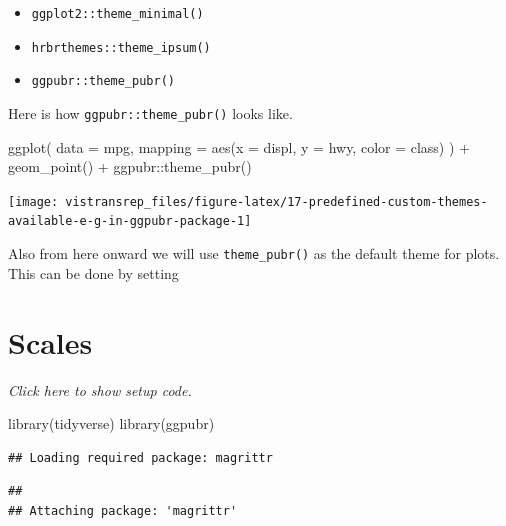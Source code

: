 \documentclass[]{book}
\newenvironment{Shaded}{}{}
\newcommand{\DataTypeTok}[1]{#1}
\newcommand{\KeywordTok}[1]{\textcolor[rgb]{0.00,0.00,1.00}{#1}}
\newcommand{\NormalTok}[1]{#1}
\newcommand{\OperatorTok}[1]{#1}
\newcommand{\StringTok}[1]{\textcolor[rgb]{0.00,0.50,0.50}{#1}}
\providecommand{\tightlist}{%
  \setlength{\itemsep}{0pt}\setlength{\parskip}{0pt}}
\begin{document}
\begin{itemize}
\tightlist
\item
  \texttt{ggplot2::theme\_minimal()}
\item
  \texttt{hrbrthemes::theme\_ipsum()}
\item
  \texttt{ggpubr::theme\_pubr()}
\end{itemize}

Here is how \texttt{ggpubr::theme\_pubr()} looks like.

\begin{Shaded}
\begin{Highlighting}[]
\KeywordTok{ggplot}\NormalTok{(}
  \DataTypeTok{data =}\NormalTok{ mpg,}
  \DataTypeTok{mapping =} \KeywordTok{aes}\NormalTok{(}\DataTypeTok{x =}\NormalTok{ displ, }\DataTypeTok{y =}\NormalTok{ hwy, }\DataTypeTok{color =}\NormalTok{ class)}
\NormalTok{) }\OperatorTok{+}
\StringTok{  }\KeywordTok{geom_point}\NormalTok{() }\OperatorTok{+}
\StringTok{  }\NormalTok{ggpubr}\OperatorTok{::}\KeywordTok{theme_pubr}\NormalTok{()}
\end{Highlighting}
\end{Shaded}

\begin{flushright}\texttt{[image: vistransrep\_files/figure-latex/17-predefined-custom-themes-available-e-g-in-ggpubr-package-1]} \end{flushright}

Also from here onward we will use \texttt{theme\_pubr()} as the default theme for plots.
This can be done by setting

\hypertarget{scales}{%
\section{Scales}\label{scales}}

\emph{Click here to show setup code.}

\begin{Shaded}
\begin{Highlighting}[]
\KeywordTok{library}\NormalTok{(tidyverse)}
\KeywordTok{library}\NormalTok{(ggpubr)}
\end{Highlighting}
\end{Shaded}

\begin{verbatim}
## Loading required package: magrittr
\end{verbatim}

\begin{verbatim}
## 
## Attaching package: 'magrittr'
\end{verbatim}
\end{document}
